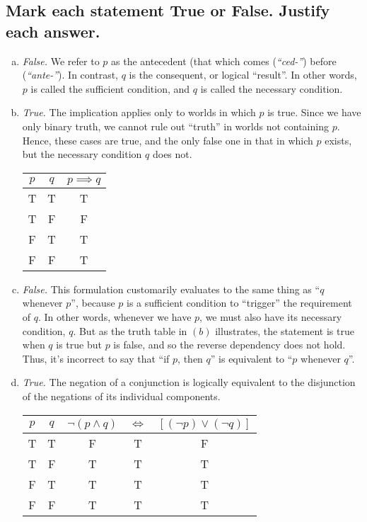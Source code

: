 \documentclass[12pt]{scrartcl} %
\begin{document}
\subsection{Mark each statement True or False. Justify each answer.}
\begin{enumerate}[(a)]
	\item \emph{False.} We refer to $p$ as the antecedent (that which comes (\emph{``ced-''}) before (\emph{``ante-''}). In contrast, $q$ is the consequent, or logical ``result''. In other words, $p$ is called the sufficient condition, and $q$ is called the necessary condition.
	\item \emph{True.} The implication applies only to worlds in which $p$ is true. Since we have only binary truth, we cannot rule out ``truth'' in worlds not containing $p$. Hence, these cases are true, and the only false one in that in which $p$ exists, but the necessary condition $q$ does not.\\
	\begin{center} 
	\begin{tabular}{*{2}{c}|*{1}{c}}$p$&$q$&$p \implies q$\\
		\hline
		T&T&T\\
		T&F&F\\
		F&T&T\\
		F&F&T\\
	\end{tabular}
	\end{center}
	\item \emph{False.} This formulation customarily evaluates to the same thing as ``$q$ whenever $p$'', because $p$ is a sufficient condition to ``trigger'' the requirement of $q$. In other words, whenever we have $p$, we must also have its necessary condition, $q$. But as the truth table in $(b)$ illustrates, the statement is true when $q$ is true but $p$ is false, and so the reverse dependency does not hold. Thus, it's incorrect to say that ``if $p$, then $q$'' is equivalent to ``$p$ whenever $q$''.
	\item \emph{True.} The negation of a conjunction is logically equivalent to the disjunction of the negations of its individual components.
	\begin{center}
	\begin{tabular}{*{2}{c}|*{3}{c}}$p$&$q$&$\neg(p \land q)$&$\iff$&$[(\neg p) \lor (\neg q)]$\\
	\hline
	T&T&F&T&F\\
	T&F&T&T&T\\
	F&T&T&T&T\\
	F&F&T&T&T\\
	\end{tabular}
	\end{center}
	

\end{enumerate}
\end{document}
